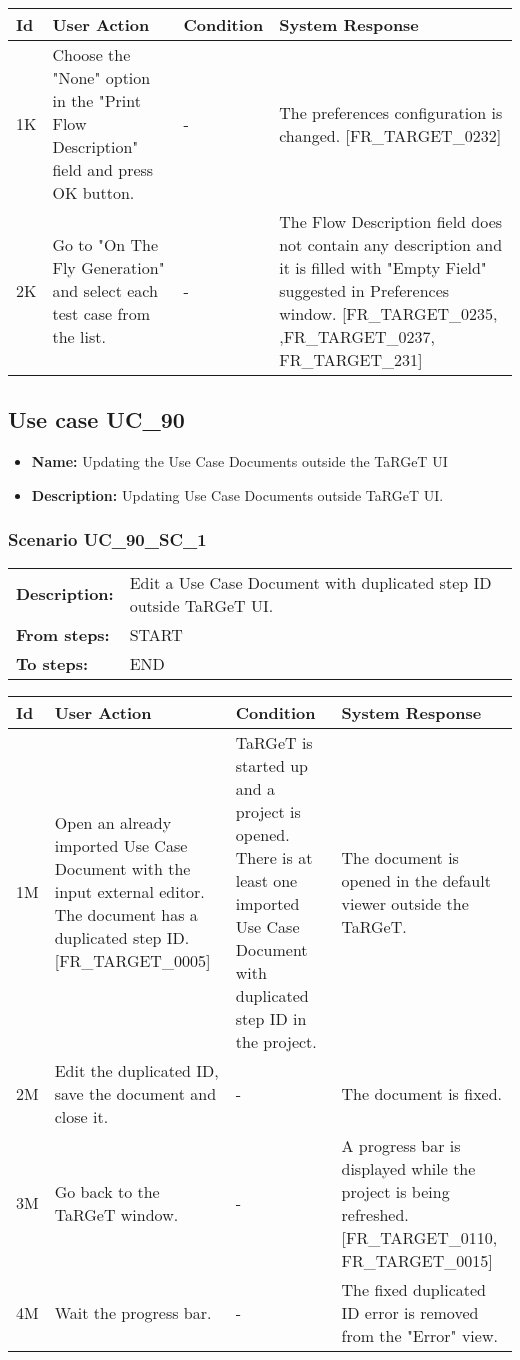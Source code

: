 \documentclass[a4paper,11pt]{article}
\newcommand{\bl}{\\ \hline}
\begin{document}
\begin{tabular}{|p{0.8in}|p{1.6in}|p{1.6in}|p{1.6in}|}
\hline
Id & User Action & Condition & System Response  \bl 
1K & Choose the "None" option in the "Print Flow Description" field and press OK button. & - & The preferences configuration is changed. [FR_TARGET_0232] \bl 
2K & Go to "On The Fly Generation" and select each test case from the list. & - & The Flow Description field does not contain any description and it is filled with "Empty Field" suggested in Preferences window. [FR_TARGET_0235, ,FR_TARGET_0237, FR_TARGET_231] \bl 
\end{tabular}
\subsection*{Use case UC_90}
\begin{itemize}
\item {\bf Name: }Updating the Use Case Documents outside the TaRGeT UI
\item {\bf Description: }Updating Use Case Documents outside TaRGeT UI.
\end{itemize}
\subsubsection*{Scenario UC_90_SC_1}
\begin{tabular}{p{1in}p{4in}}
{\bf Description:} & Edit a Use Case Document with duplicated step ID outside TaRGeT UI. \\
{\bf From steps:} & START \\
{\bf To steps:} & END \\
\end{tabular}
 
\begin{tabular}{|p{0.8in}|p{1.6in}|p{1.6in}|p{1.6in}|}
\hline
Id & User Action & Condition & System Response  \bl 
1M & Open an already imported Use Case Document with the {input} external editor. The document has a duplicated step ID. [FR_TARGET_0005] & TaRGeT is started up and a project is opened. There is at least one imported Use Case Document with duplicated step ID in the project. & The document is opened in the default viewer outside the TaRGeT. \bl 
2M & Edit the duplicated ID, save the document and close it. & - & The document is fixed. \bl 
3M & Go back to the TaRGeT window. & - & A progress bar is displayed while the project is being refreshed. [FR_TARGET_0110, FR_TARGET_0015] \bl 
4M & Wait the progress bar. & - & The fixed duplicated ID error is removed from the "Error" view. \bl 
\end{tabular}
\end{document}
